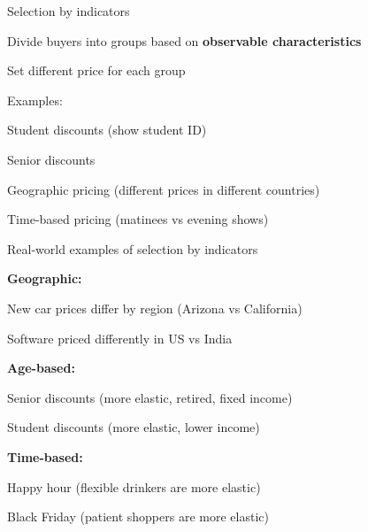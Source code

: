 \documentclass[notes,11pt, aspectratio=169]{beamer}
\newenvironment{wideitemize}{\itemize\addtolength{\itemsep}{10pt}}{\enditemize}
\newenvironment{wideenumerate}{\enumerate\addtolength{\itemsep}{10pt}}{\endenumerate}
\begin{document}
\begin{frame}{Selection by indicators}
	\begin{wideitemize}
		\item Divide buyers into groups based on \textbf{observable characteristics}
		\item Set different price for each group
		\item Examples:
		\begin{wideitemize}
			\vspace{5pt}
			\item Student discounts (show student ID)
			\item Senior discounts
			\item Geographic pricing (different prices in different countries)
			\item Time-based pricing (matinees vs evening shows)
		\end{wideitemize}
	\end{wideitemize}
\end{frame}

\begin{frame}{Real-world examples of selection by indicators}
	\begin{wideenumerate}
		\item \textbf{Geographic:}
		\begin{wideitemize}
			\vspace{3pt}
			\item New car prices differ by region (Arizona vs California)
			\item Software priced differently in US vs India
		\end{wideitemize}
		\item \textbf{Age-based:}
		\begin{wideitemize}
			\vspace{3pt}
			\item Senior discounts (more elastic, retired, fixed income)
			\item Student discounts (more elastic, lower income)
		\end{wideitemize}
		\item \textbf{Time-based:}
		\begin{wideitemize}
			\vspace{3pt}
			\item Happy hour (flexible drinkers are more elastic)
			\item Black Friday (patient shoppers are more elastic)
		\end{wideitemize}
	\end{wideenumerate}
\end{frame}
\end{document}
